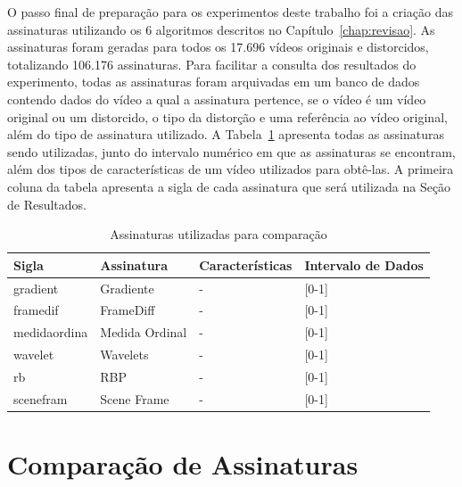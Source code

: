 O passo final de preparação para os experimentos deste trabalho foi a criação das assinaturas utilizando os 6 algoritmos descritos no Capítulo~\ref{chap:revisao}. As assinaturas foram geradas para todos os 17.696 vídeos originais e distorcidos, totalizando 106.176 assinaturas. Para facilitar a consulta dos resultados do experimento, todas as assinaturas foram arquivadas em um banco de dados contendo dados do vídeo a qual a assinatura pertence, se o vídeo é um vídeo original ou um distorcido, o tipo da distorção e uma referência ao vídeo original, além do tipo de assinatura utilizado. A Tabela~\ref{tab:assinaturas} apresenta todas as assinaturas sendo utilizadas, junto do intervalo numérico em que as assinaturas se encontram, além dos tipos de características de um vídeo utilizados para obtê-las. A primeira coluna da tabela apresenta a sigla de cada assinatura que será utilizada na Seção de Resultados.

\begin{table}[h]
    \centering
    \caption{Assinaturas utilizadas para comparação}
    \label{tab:assinaturas}
    \begin{tabular}{|p{}|p{}|p{}|p{}|} \hline
        \textbf{Sigla} & \textbf{Assinatura} & \textbf{Características} & \textbf{Intervalo de Dados} \\ \hline
        gradient & Gradiente & - & [0-1] \\ \hline
        framedif & FrameDiff & - & [0-1] \\ \hline
        medidaordina & Medida Ordinal & - & [0-1] \\ \hline
        wavelet & Wavelets & - & [0-1] \\ \hline
        rb & RBP & - & [0-1] \\ \hline
        scenefram & Scene Frame & - & [0-1] \\ \hline
    \end{tabular}
\end{table}

\section{Comparação de Assinaturas}
\label{sec:met-comparacao}


